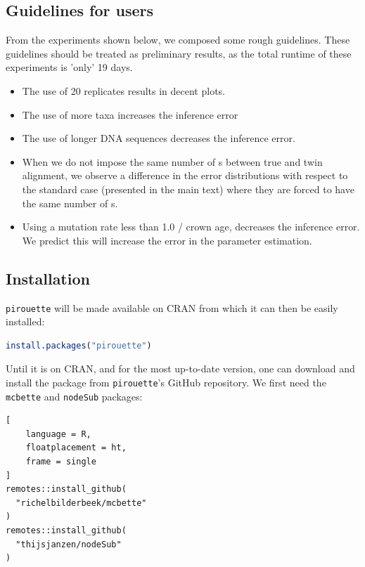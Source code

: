 \subsection{Guidelines for users}
\label{subsec:guidelines}

From the experiments shown below, we composed some rough guidelines.
These guidelines should be treated as preliminary results, as
the total runtime of these experiments is 'only' 19 days.

\begin{itemize}
  \item{
    The use of 20 replicates results in decent plots.
  }
  \item{
    The use of more taxa increases the inference error
  }
  \item{
    The use of longer DNA sequences decreases the inference error.
  }
  \item{
    When we do not impose the same number of s 
    between true and twin alignment, we observe a difference in the error 
    distributions with respect to the standard case (presented in the main 
    text) where they are forced to have the same number of s.
  }
  \item{
    Using a mutation rate less than 1.0 / crown age, decreases the
    inference error. We predict this will increase the error in the parameter
    estimation.
  }
\end{itemize}

\subsection{Installation}
\label{subsec:installation}

\verb;pirouette; will be made available on CRAN from which 
it can then be easily installed:
\begin{lstlisting}[language=R, floatplacement=ht, frame=single]
install.packages("pirouette")
\end{lstlisting}

Until it is on CRAN, and for the most up-to-date version, 
one can download and install the package from \verb;pirouette;'s GitHub 
repository. We first need the \verb;mcbette; and \verb;nodeSub; packages:
\begin{lstlisting}[
    language = R,
    floatplacement = ht,
    frame = single
]
remotes::install_github(
  "richelbilderbeek/mcbette"
)
remotes::install_github(
  "thijsjanzen/nodeSub"
)
\end{lstlisting}

